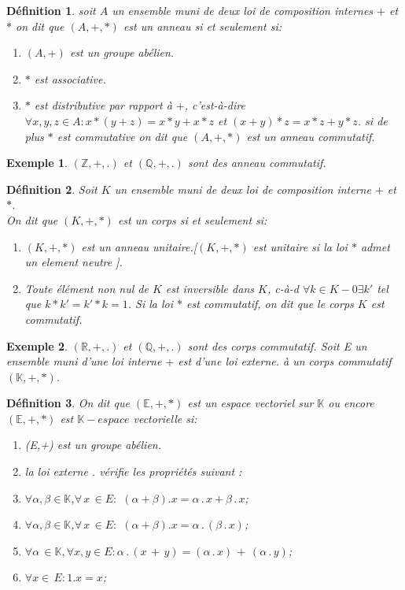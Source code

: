 \documentclass[12pt]{report}
\newtheorem{madef}{Définition}[section]
\newtheorem{exemple}{Exemple}[section]
\begin{document}
\begin{madef}
soit $A$ un ensemble muni de deux loi de composition internes $+$ et $*$ on dit que $(A,+,*)$ est un anneau si et seulement si:
\begin{enumerate}
\item[1.] $(A,+)$ est un groupe abélien.
\item[2.] $*$ est associative.
\item[3.] $*$ est distributive par rapport à $+$, c'est-à-dire $\forall x,y,z\in A: x*(y+z)=x*y+x*z$ et $(x+y)*z=x*z+y*z$.
si de plus $*$ est commutative on dit que $(A,+,*)$ est un anneau commutatif.      
\end{enumerate}
\end{madef}        
\begin{exemple} $(\mathbb{Z},+,.)$ et $(\mathbb{Q,+,.})$ sont des anneau commutatif.
\end{exemple}
\begin{madef} Soit $K$ un ensemble muni de deux loi de composition interne $+$ et $*$. \\
On dit que $(K,+,*)$ est un corps si et seulement si:
\begin{enumerate}
\item[i)] $(K,+,*)$ est un anneau unitaire.[$(K,+,*)$ est unitaire si la loi $*$ admet un element neutre ].
\item[ii)] Toute élément non nul de $K$ est inversible dans $K$, c-à-d $\forall k\in K-{0} \exists k'$ tel que $k*k'=k'*k=1$.   
Si la loi $*$ est commutatif, on dit que le corps $K$ est commutatif.
\end{enumerate}
\end{madef}  
\begin{exemple} $(\mathbb{R},+,.)$ et $(\mathbb{Q},+,.)$ sont des corps commutatif. 
     Soit E un ensemble muni d'une loi interne $+$ est d'une loi externe. à un corps commutatif $(\mathbb{K,+,*})$.
\end{exemple}
\begin{madef} On dit que $(\mathbb{E,+,*})$ est un espace vectoriel sur $\mathbb{K}$ ou encore $(\mathbb{E,+,*})$ est  $\mathbb{K}-espace$ vectorielle si:
\begin{enumerate}
\item[1.] (E,+) est un groupe abélien.
\item[2.] la loi externe . vérifie les propriétés suivant :
  \item[i)]   $\forall \alpha ,\beta \in \mathbb{K}$,$\forall\,x\,\in E :$ $(\alpha+\beta).x=\alpha\,.\,x+\beta\, .\, x$;  
  \item[ii)]  $\forall \alpha ,\beta \in \mathbb{K}$,$\forall\,x\,\in E :$  $(\alpha+\beta).x=\alpha\,.\,(\beta\,.\,x)$;
  \item[iii)] $\forall \alpha \, \in \mathbb{K}, \forall x,y\in E : \alpha\,.\,(x\,+\,y)=(\alpha\,.\,x)\,+\,(\alpha\,.\,y)$;
  \item[iv]   $\forall x \in \,E: 1.x=x$;
    
\end{enumerate}
\end{madef}     
\end{document}
